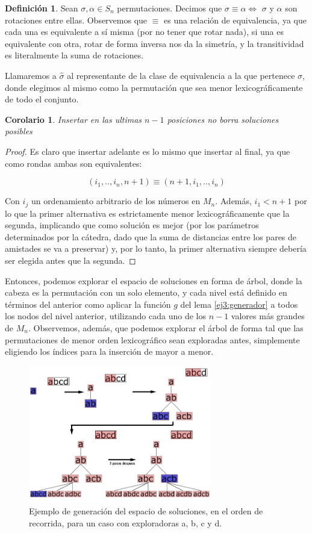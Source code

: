 \documentclass{article}
\newtheorem{corollary}{Corolario}[theorem]
\theoremstyle{definition}
\newtheorem{definition}{Definición}[section]
\theoremstyle{remark}
\begin{document}
\begin{definition}
Sean $\sigma, \alpha \in S_n$ permutaciones. Decimos que $\sigma \equiv \alpha \iff$ $\sigma$ y $\alpha$ son rotaciones entre ellas. Observemos que $\equiv$ es una relación de equivalencia, ya que cada una es equivalente a sí misma (por no tener que rotar nada), si una es equivalente con otra, rotar de forma inversa nos da la simetría, y la transitividad es literalmente la suma de rotaciones.

Llamaremos a $\hat{\sigma}$ al representante de la clase de equivalencia a la que pertenece $\sigma$, donde elegimos al mismo como la permutación que sea menor lexicográficamente de todo el conjunto.
\end{definition}

\begin{corollary}
Insertar en las ultimas $n-1$ posiciones no borra soluciones posibles
\end{corollary}

\begin{proof}
Es claro que insertar adelante es lo mismo que insertar al final, ya que como rondas ambas son equivalentes:

$$(i_1, .., i_n, n+1) \equiv (n+1, i_1, .., i_n)$$

Con $i_j$ un ordenamiento arbitrario de los números en $M_n$. Además, $i_1 < n+1$ por lo que la primer alternativa es estrictamente menor lexicográficamente que la segunda, implicando que como solución es mejor (por los parámetros determinados por la cátedra, dado que la suma de distancias entre los pares de amistades se va a preservar) y, por lo tanto, la primer alternativa siempre debería ser elegida antes que la segunda.
\end{proof}

Entonces, podemos explorar el espacio de soluciones en forma de árbol, donde la cabeza es la permutación con un solo elemento, y cada nivel está definido en términos del anterior como aplicar la función $g$ del lema \ref{ej3:generador} a todos los nodos del nivel anterior, utilizando cada uno de los $n-1$ valores más grandes de $M_n$. Observemos, además, que podemos explorar el árbol de forma tal que las permutaciones de menor orden lexicográfico sean exploradas antes, simplemente eligiendo los índices para la inserción de mayor a menor.

\begin{figure}[h!]
\centering
\includegraphics[width=8cm]{images/treeEvolution}
\caption{Ejemplo de generación del espacio de soluciones, en el orden de recorrida, para un caso con exploradoras a, b, c y d.}
\end{figure}
\end{document}
